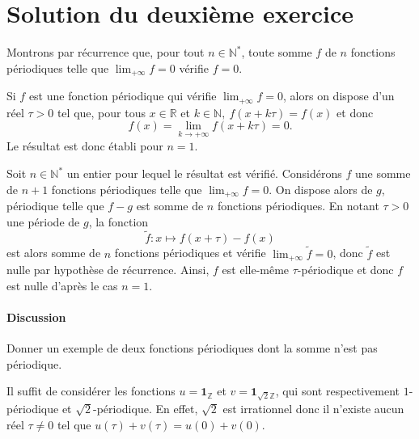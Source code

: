 \section{Solution du deuxième exercice}

Montrons par récurrence que, pour tout $n \in \mathbb N^*$, toute somme $f$ de $n$
fonctions périodiques telle que $\lim_{+\infty} f = 0$ vérifie $f = 0$.

Si $f$ est une fonction périodique qui vérifie $\lim_{+\infty} f = 0$, alors on
dispose d'un réel $\tau > 0$ tel que, pour tous $x \in \mathbb R$ et $k \in
\mathbb N,\ f(x+k\tau) = f(x)$ et donc
$$
f(x) = \lim_{k\to +\infty} f(x + k\tau) = 0.
$$
Le résultat est donc établi pour $n = 1$.

Soit $n \in \mathbb N^*$ un entier pour lequel le résultat est
  vérifié.
  Considérons $f$ une somme de $n+1$ fonctions périodiques
  telle que $\lim_{+\infty} f = 0$.  On dispose alors de $g$,
  périodique telle que $f- g$ est somme de $n$ fonctions
  périodiques.  En notant $\tau > 0$ une période de $g$, la fonction
    $$
        \tilde f : x\longmapsto f(x+\tau) - f(x)
    $$
  est alors somme de $n$ fonctions périodiques et vérifie
  $\lim_{+\infty} \tilde f =0$,
  donc $\tilde f$ est nulle par hypothèse de récurrence. Ainsi, $f$ est
  elle-même $\tau$-périodique et donc $f$ est nulle d'après le cas $n = 1$.

\paragraph{Discussion}

Donner un exemple de deux fonctions périodiques dont la somme
n'est pas périodique.

Il suffit de considérer les fonctions $u = \mathbf 1_{\mathbb Z}$ et $v = \mathbf
1_{\sqrt 2 \mathbb Z}$, qui sont respectivement $1$-périodique et $\sqrt 2$-périodique. En effet, $\sqrt 2$ est irrationnel donc il n'existe aucun réel $\tau \neq 0$ tel que
$u(\tau) + v(\tau) = u(0) + v(0)$.
